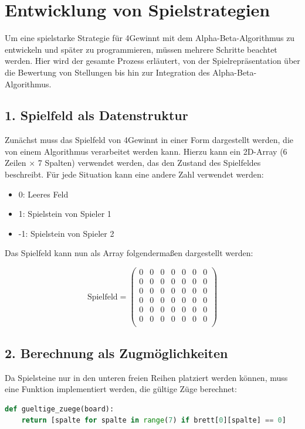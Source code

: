 \section{Entwicklung von Spielstrategien}
	
Um eine spielstarke Strategie für 4Gewinnt mit dem Alpha-Beta-Algorithmus zu entwickeln und später zu programmieren, müssen mehrere Schritte beachtet werden. Hier wird der gesamte Prozess erläutert, von der Spielrepräsentation über die Bewertung von Stellungen bis hin zur Integration des Alpha-Beta-Algorithmus.

\subsection*{1. Spielfeld als Datenstruktur}
Zunächst muss das Spielfeld von 4Gewinnt in einer Form dargestellt werden, die von einem Algorithmus verarbeitet werden kann.
Hierzu kann ein 2D-Array (6 Zeilen × 7 Spalten) verwendet werden, das den Zustand des Spielfeldes beschreibt. Für jede Situation kann eine andere Zahl verwendet werden:
\begin{itemize}
	\item 0: Leeres Feld
	\item 1: Spielstein von Spieler 1
	\item -1: Spielstein von Spieler 2
\end{itemize}

Das Spielfeld kann nun als Array folgendermaßen dargestellt werden:

\[
\text{Spielfeld} =
\begin{pmatrix}
	0 & 0 & 0 & 0 & 0 & 0 & 0 \\
	0 & 0 & 0 & 0 & 0 & 0 & 0 \\
	0 & 0 & 0 & 0 & 0 & 0 & 0 \\
	0 & 0 & 0 & 0 & 0 & 0 & 0 \\
	0 & 0 & 0 & 0 & 0 & 0 & 0 \\
	0 & 0 & 0 & 0 & 0 & 0 & 0 \\
\end{pmatrix}
\]

\subsection*{2. Berechnung als Zugmöglichkeiten }
Da Spielsteine nur in den unteren freien Reihen platziert werden können, muss eine Funktion implementiert werden, die gültige Züge berechnet:

\begin{lstlisting}[language=Python, caption=Funktion zur Berechnung gültiger Züge]
	def gueltige_zuege(board):
	return [spalte for spalte in range(7) if brett[0][spalte] == 0]
\end{lstlisting}

